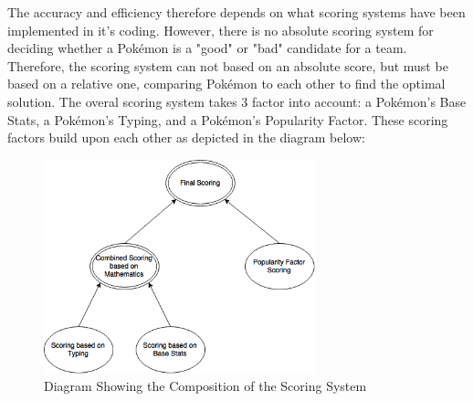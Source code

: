 \documentclass{article}
\begin{document}
The accuracy and efficiency therefore depends on what scoring systems have been implemented  in it's coding. However, there is no absolute scoring system for deciding whether a Pok\'emon is a "good" or "bad" candidate for a team. Therefore, the scoring system can not based on an absolute score, but must be based on a relative one, comparing Pok\'emon to each other to find the optimal solution. The overal scoring system takes 3 factor into account: a Pok\'emon's Base Stats, a Pok\'emon's Typing, and a Pok\'emon's Popularity Factor. These scoring factors build upon each other as depicted in the diagram below:
\begin{figure}[H]
	\includegraphics[width=0.7\textwidth]{ScoringDiagram.png}
	\centering
	\caption{Diagram Showing the Composition of the Scoring System}\label{ScoringComposition}
\end{figure}
\end{document}
